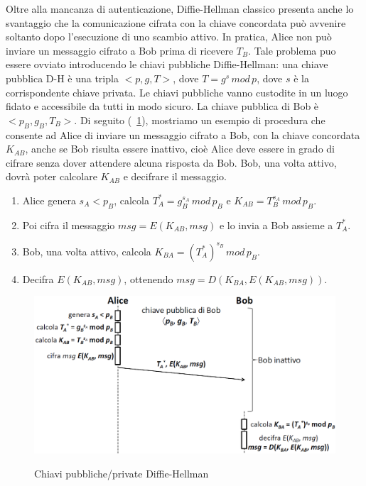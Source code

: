 Oltre alla mancanza di autenticazione, Diffie-Hellman classico presenta anche lo svantaggio che la comunicazione cifrata con la chiave concordata può avvenire soltanto dopo l'esecuzione di uno scambio attivo. In pratica, Alice non può inviare un messaggio cifrato a Bob prima di ricevere $T_{B}$. Tale problema puo essere ovviato introducendo le chiavi pubbliche Diffie-Hellman: una chiave pubblica D-H è una tripla $<p, g, T>$, dove $T = g^s \, mod \, p$, dove $s$ è la corrispondente chiave privata. Le chiavi pubbliche vanno custodite in un luogo fidato e accessibile da tutti in modo sicuro. La chiave pubblica di Bob è $<p_{B}, g_{B}, T_{B}>$. \newline \newline
Di seguito (\figurename~\ref{fig:authex}), mostriamo un esempio di procedura che consente ad Alice di inviare un messaggio cifrato a Bob, con la chiave concordata $K_{AB}$, anche se Bob risulta essere inattivo, cioè Alice deve essere in grado di cifrare senza dover attendere alcuna risposta da Bob. Bob, una volta attivo, dovrà poter calcolare $K_{AB}$ e decifrare il messaggio.
\begin{enumerate}
\item Alice genera $s_{A}<p_{B}$, calcola $T_{A}^{*}=g_{B}^{s_{A}} \, mod \, p_{B}$ e $K_{AB}=T_{B}^{s_{A}} \, mod \, p_{B}$.
\item Poi cifra il messaggio $msg=E(K_{AB},msg)$ e lo invia a Bob assieme a $T_{A}^{*}$.
\item Bob, una volta attivo, calcola  $K_{BA}=(T_{A}^*)^{s_{B}} \, mod \, p_{B}$.
\item Decifra $E(K_{AB},msg)$, ottenendo $msg=D(K_{BA},E(K_{AB},msg))$.
\end{enumerate}
\begin{figure}[htbp]
	\centering%
	\subfigure%
	{\includegraphics[scale=0.6, keepaspectratio]{Immagini/chiave_pubblica/DiffieHellman_pubseckey.png}}
	\caption{Chiavi pubbliche/private Diffie-Hellman}
	\label{fig:authex}
\end{figure} 

